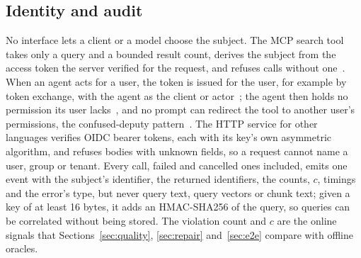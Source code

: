 \subsection{Identity and audit}\label{sec:sys-identity}

No interface lets a client or a model choose the subject. The MCP search tool takes only a query and
a bounded result count, derives the subject from the access token the server verified for the
request, and refuses calls without one~\cite{mcp2026model}. When an agent acts for a user, the token
is issued for the user, for example by token exchange, with the agent as the client or
actor~\cite{jones2020oauth}; the agent then holds no permission its user lacks~\cite{mitre2026atlas},
and no prompt can redirect the tool to another user's permissions, the confused-deputy
pattern~\cite{hardy1988confused}. The HTTP service for other languages verifies OIDC bearer tokens,
each with its key's own asymmetric algorithm, and refuses bodies with unknown fields, so a request
cannot name a user, group or tenant. Every call, failed and cancelled ones included, emits one event
with the subject's identifier, the returned identifiers, the counts, $c$, timings and the error's
type, but never query text, query vectors or chunk text; given a key of at least 16 bytes, it adds an
HMAC-SHA256 of the query, so queries can be correlated without being stored. The violation count and
$c$ are the online signals that Sections~\ref{sec:quality}, \ref{sec:repair} and~\ref{sec:e2e}
compare with offline oracles.
